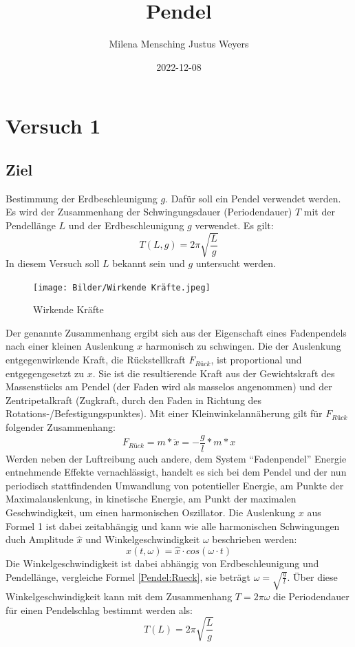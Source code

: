 \documentclass[
  9pt,
]{article}
\title{Pendel}
\author{Milena Mensching Justus Weyers}
\date{2022-12-08}
\begin{document}
\maketitle

\hypertarget{versuch-1}{%
\section{Versuch 1}\label{versuch-1}}

\hypertarget{ziel}{%
\subsection{Ziel}\label{ziel}}

Bestimmung der Erdbeschleunigung \(g\). Dafür soll ein Pendel verwendet
werden. Es wird der Zusammenhang der Schwingungsdauer (Periodendauer)
\(T\) mit der Pendellänge \(L\) und der Erdbeschleunigung \(g\)
verwendet. Es gilt: \[T(L,g) = 2\pi \sqrt{\frac{L}{g}}\] In diesem
Versuch soll \(L\) bekannt sein und \(g\) untersucht werden.

\begin{figure}
\centering
\texttt{[image: Bilder/Wirkende Kräfte.jpeg]}
\caption{Wirkende Kräfte}
\end{figure}

Der genannte Zusammenhang ergibt sich aus der Eigenschaft eines
Fadenpendels nach einer kleinen Auslenkung \(x\) harmonisch zu
schwingen. Die der Auslenkung entgegenwirkende Kraft, die Rückstellkraft
\(F_{Rück}\), ist proportional und entgegengesetzt zu \(x\). Sie ist die
resultierende Kraft aus der Gewichtskraft des Massenstücks am Pendel
(der Faden wird als masselos angenommen) und der Zentripetalkraft
(Zugkraft, durch den Faden in Richtung des
Rotations-/Befestigungspunktes). Mit einer Kleinwinkelannäherung gilt
für \(F_{Rück}\) folgender Zusammenhang:
\begin{equation}\label{Pendel:Rueck}
F_{Rück} = m * \ddot{x} = -\frac{g}{l}*m*x
\end{equation} Werden neben der Luftreibung auch andere, dem System
``Fadenpendel'' Energie entnehmende Effekte vernachlässigt, handelt es
sich bei dem Pendel und der nun periodisch stattfindenden Umwandlung von
potentieller Energie, am Punkte der Maximalauslenkung, in kinetische
Energie, am Punkt der maximalen Geschwindigkeit, um einen harmonischen
Oszillator. Die Auslenkung \(x\) aus Formel 1 \label{Pendel:Ruek} ist
dabei zeitabhängig und kann wie alle harmonischen Schwingungen duch
Amplitude \(\hat{x}\) und Winkelgeschwindigkeit \(\omega\) beschrieben
werden: \begin{equation}\label{Pendel:Schwingung}
  x(t,\omega) = \hat{x} \cdot cos(\omega \cdot t)
\end{equation} Die Winkelgeschwindigkeit ist dabei abhängig von
Erdbeschleunigung und Pendellänge, vergleiche Formel \ref{Pendel:Rueck},
sie beträgt \(\omega=\sqrt{\frac{g}{l}}\). Über diese
Winkelgeschwindigkeit kann mit dem Zusammenhang \(T=2\pi\omega\) die
Periodendauer für einen Pendelschlag bestimmt werden als:
\begin{equation}\label{Pendel:Periodendauer}
T(L) = 2\pi \sqrt{\frac{L}{g}}
\end{equation}
\end{document}
